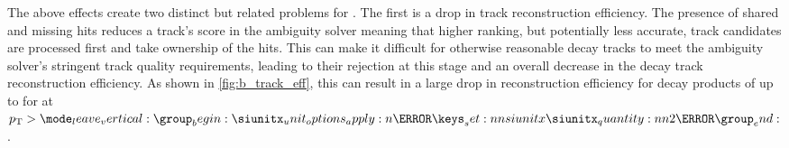 The above effects create two distinct but related  problems for \btagging.
The first is a drop in track reconstruction efficiency.
The presence of shared and missing hits reduces a track's score in the ambiguity solver meaning that higher ranking, but potentially less accurate, track candidates are processed first and take ownership of the hits.
This can make it difficult for otherwise reasonable \bhadron decay tracks to meet the ambiguity solver's stringent track quality requirements, leading to their rejection at this stage and an overall decrease in the \bhadron decay track reconstruction efficiency.
As shown in \cref{fig:b_track_eff}, this can result in a large drop in reconstruction efficiency for \bhadron decay products of up to  for at $\pt > \SI{2}{\TeV}$.

